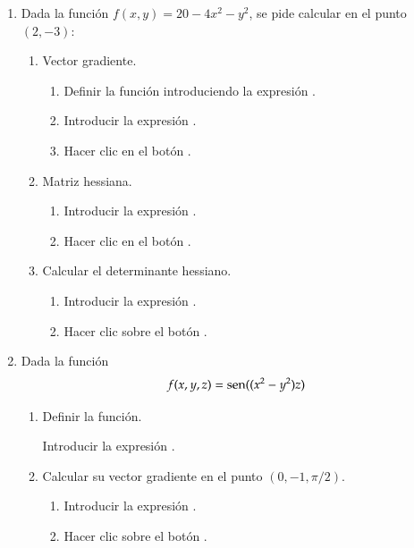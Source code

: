 \begin{enumerate}[leftmargin=*]
\item Dada la función $f(x,y)=20-4x^2-y^2$, se pide calcular en el punto $(2,-3)$:
\begin{enumerate}
\item Vector gradiente.
\begin{indicacion}
\begin{enumerate}
\item Definir la función introduciendo la expresión .
\item Introducir la expresión .
\item Hacer clic en el botón .
\end{enumerate}
\end{indicacion}

\item Matriz hessiana.
\begin{indicacion}
\begin{enumerate}
\item Introducir la expresión .
\item Hacer clic en el botón .
\end{enumerate}
\end{indicacion}

\item Calcular el determinante hessiano.
\begin{indicacion}
\begin{enumerate}
\item Introducir la expresión .
\item Hacer clic sobre el botón .
\end{enumerate}
\end{indicacion}
\end{enumerate} 


\item Dada la función
\[
f(x,y,z)=\operatorname{sen}((x^2-y^2)z)
\]
\begin{enumerate}
\item Definir la función.
\begin{indicacion}
Introducir la expresión .
\end{indicacion}

\item Calcular su vector gradiente en el punto $(0,-1,\pi/2)$.
\begin{indicacion}
\begin{enumerate}
\item Introducir la expresión .
\item Hacer clic sobre el botón .
\end{enumerate}
\end{indicacion}


\end{enumerate}
\end{enumerate}
